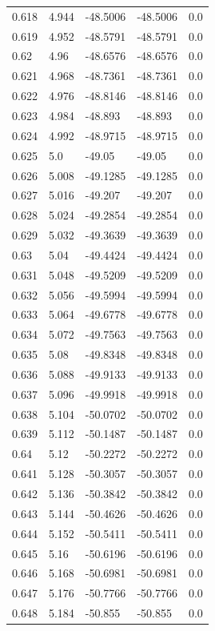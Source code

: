 \begin{table}[H]
\begin{tabular}{lllll}
0.618 & 4.944 & -48.5006 & -48.5006 & 0.0 \\
0.619 & 4.952 & -48.5791 & -48.5791 & 0.0 \\
0.62 & 4.96 & -48.6576 & -48.6576 & 0.0 \\
0.621 & 4.968 & -48.7361 & -48.7361 & 0.0 \\
0.622 & 4.976 & -48.8146 & -48.8146 & 0.0 \\
0.623 & 4.984 & -48.893 & -48.893 & 0.0 \\
0.624 & 4.992 & -48.9715 & -48.9715 & 0.0 \\
0.625 & 5.0 & -49.05 & -49.05 & 0.0 \\
0.626 & 5.008 & -49.1285 & -49.1285 & 0.0 \\
0.627 & 5.016 & -49.207 & -49.207 & 0.0 \\
0.628 & 5.024 & -49.2854 & -49.2854 & 0.0 \\
0.629 & 5.032 & -49.3639 & -49.3639 & 0.0 \\
0.63 & 5.04 & -49.4424 & -49.4424 & 0.0 \\
0.631 & 5.048 & -49.5209 & -49.5209 & 0.0 \\
0.632 & 5.056 & -49.5994 & -49.5994 & 0.0 \\
0.633 & 5.064 & -49.6778 & -49.6778 & 0.0 \\
0.634 & 5.072 & -49.7563 & -49.7563 & 0.0 \\
0.635 & 5.08 & -49.8348 & -49.8348 & 0.0 \\
0.636 & 5.088 & -49.9133 & -49.9133 & 0.0 \\
0.637 & 5.096 & -49.9918 & -49.9918 & 0.0 \\
0.638 & 5.104 & -50.0702 & -50.0702 & 0.0 \\
0.639 & 5.112 & -50.1487 & -50.1487 & 0.0 \\
0.64 & 5.12 & -50.2272 & -50.2272 & 0.0 \\
0.641 & 5.128 & -50.3057 & -50.3057 & 0.0 \\
0.642 & 5.136 & -50.3842 & -50.3842 & 0.0 \\
0.643 & 5.144 & -50.4626 & -50.4626 & 0.0 \\
0.644 & 5.152 & -50.5411 & -50.5411 & 0.0 \\
0.645 & 5.16 & -50.6196 & -50.6196 & 0.0 \\
0.646 & 5.168 & -50.6981 & -50.6981 & 0.0 \\
0.647 & 5.176 & -50.7766 & -50.7766 & 0.0 \\
0.648 & 5.184 & -50.855 & -50.855 & 0.0 \\

\end{tabular}
\end{table}
